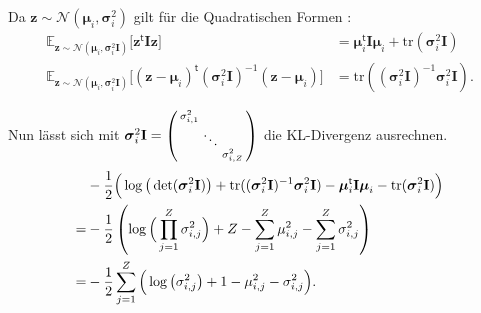 \documentclass[12pt]{article}
\newcommand{\z}{\mathbf{z}}
\begin{document}
	Da $\z\sim\mathcal{N}(\boldsymbol\mu_{i},\boldsymbol\sigma_{i}^{2})$ gilt für die Quadratischen Formen \cite{matrix}:
	\begin{align*}
	\mathbb{E}_{\z\sim\mathcal{N}(\boldsymbol\mu_{i},\boldsymbol\sigma_{i}^{2}\mathbf{I})}\big[\textbf{z}^{\mathsf{t}}\mathbf{I}\textbf{z}\big] &= \boldsymbol\mu_{i}^{\mathsf{t}}\mathbf{I}\boldsymbol\mu_{i}+\mathrm{tr}(\boldsymbol\sigma_{i}^{2}\mathbf{I})\\ \mathbb{E}_{\z\sim\mathcal{N}(\boldsymbol\mu_{i},\boldsymbol\sigma_{i}^{2}\mathbf{I})}\big[(\textbf{z}-\boldsymbol\mu_{i})^{\mathsf{t}}(\boldsymbol\sigma_{i}^{2}\mathbf{I})^{-1}(\textbf{z}-\boldsymbol\mu_{i})\big] &= \mathrm{tr}((\boldsymbol\sigma_{i}^{2}\mathbf{I})^{-1}\boldsymbol\sigma_{i}^{2}\mathbf{I}).
	\end{align*}

	
	Nun lässt sich mit ${\boldsymbol\sigma_{i}^{2}\mathbf{I}} =  \begin{psmallmatrix}\sigma_{i,1}^{2} & \ &\ \\ \ & \ddots &\ \\ \ & \ &\sigma_{i,Z}^{2}\end{psmallmatrix}$ die KL-Divergenz ausrechnen.
	\begin{align*}
	&-\frac{1}{2}\Big(\log\big(\det(\boldsymbol\sigma_{i}^{2}\mathbf{I})\big)+\mathrm{tr}((\boldsymbol\sigma_{i}^{2}\mathbf{I})^{-1}\boldsymbol\sigma_{i}^{2}\mathbf{I})-\boldsymbol\mu_{i}^{\mathsf{t}}\textbf{I}\boldsymbol\mu_{i}-\mathrm{tr}(\boldsymbol\sigma_{i}^{2}\mathbf{I})\Big) \notag \\
	= &-\frac{1}{2}\left(\log\Big(\prod_{j=1}^{Z}\sigma_{i,j}^{2}\Big)+Z-\sum_{j=1}^{Z}\mu_{i,j}^{2}-\sum_{j=1}^{Z}\sigma_{i,j}^{2}\right) \notag \\
	= &-\frac{1}{2}\sum_{j=1}^{Z}\Big(\log\big(\sigma_{i,j}^{2}\big)+1-\mu_{i,j}^{2}-\sigma_{i,j}^{2}\Big).
	\end{align*}
	
\end{document}
